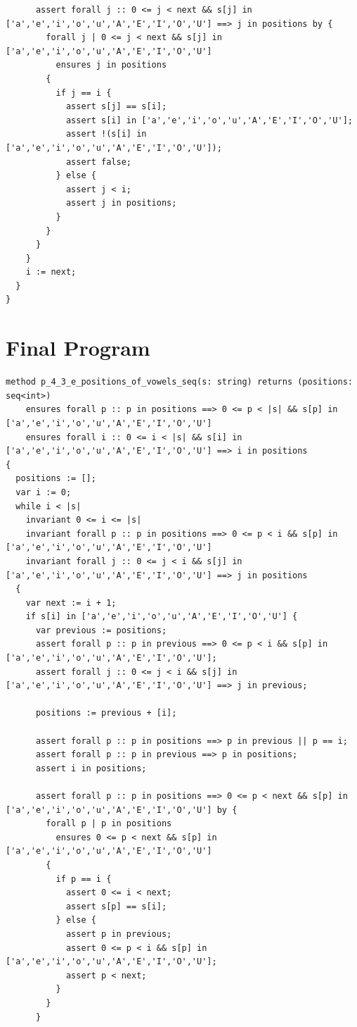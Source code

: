 \documentclass{article}
\begin{document}
\begin{lstlisting}
      assert forall j :: 0 <= j < next && s[j] in ['a','e','i','o','u','A','E','I','O','U'] ==> j in positions by {
        forall j | 0 <= j < next && s[j] in ['a','e','i','o','u','A','E','I','O','U']
          ensures j in positions
        {
          if j == i {
            assert s[j] == s[i];
            assert s[i] in ['a','e','i','o','u','A','E','I','O','U'];
            assert !(s[i] in ['a','e','i','o','u','A','E','I','O','U']);
            assert false;
          } else {
            assert j < i;
            assert j in positions;
          }
        }
      }
    }
    i := next;
  }
}
\end{lstlisting}
\section*{Final Program}
\begin{lstlisting}
method p_4_3_e_positions_of_vowels_seq(s: string) returns (positions: seq<int>)
	ensures forall p :: p in positions ==> 0 <= p < |s| && s[p] in ['a','e','i','o','u','A','E','I','O','U']
	ensures forall i :: 0 <= i < |s| && s[i] in ['a','e','i','o','u','A','E','I','O','U'] ==> i in positions
{
  positions := [];
  var i := 0;
  while i < |s|
    invariant 0 <= i <= |s|
    invariant forall p :: p in positions ==> 0 <= p < i && s[p] in ['a','e','i','o','u','A','E','I','O','U']
    invariant forall j :: 0 <= j < i && s[j] in ['a','e','i','o','u','A','E','I','O','U'] ==> j in positions
  {
    var next := i + 1;
    if s[i] in ['a','e','i','o','u','A','E','I','O','U'] {
      var previous := positions;
      assert forall p :: p in previous ==> 0 <= p < i && s[p] in ['a','e','i','o','u','A','E','I','O','U'];
      assert forall j :: 0 <= j < i && s[j] in ['a','e','i','o','u','A','E','I','O','U'] ==> j in previous;

      positions := previous + [i];

      assert forall p :: p in positions ==> p in previous || p == i;
      assert forall p :: p in previous ==> p in positions;
      assert i in positions;

      assert forall p :: p in positions ==> 0 <= p < next && s[p] in ['a','e','i','o','u','A','E','I','O','U'] by {
        forall p | p in positions
          ensures 0 <= p < next && s[p] in ['a','e','i','o','u','A','E','I','O','U']
        {
          if p == i {
            assert 0 <= i < next;
            assert s[p] == s[i];
          } else {
            assert p in previous;
            assert 0 <= p < i && s[p] in ['a','e','i','o','u','A','E','I','O','U'];
            assert p < next;
          }
        }
      }


\end{lstlisting}
\end{document}
